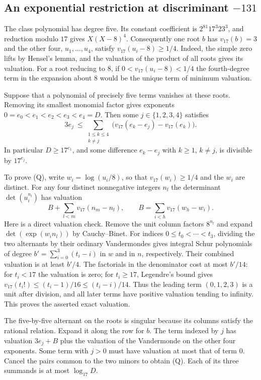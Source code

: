 \subsection{An exponential restriction at discriminant \texorpdfstring{$-131$}{-131}}
The class polynomial has degree five. Its constant coefficient is
$2^{81}17^3 23^3$, and reduction modulo $17$ gives $X(X-8)^4$.
Consequently one root $b$ has $v_{17}(b)=3$ and the other four,
$u_1,\ldots,u_4$, satisfy $v_{17}(u_i-8)\ge1/4$.
Indeed, the simple zero lifts by Hensel's lemma, and the valuation of
the product of all roots gives its valuation. For a root reducing to
$8$, if $0<v_{17}(u_i-8)<1/4$ the fourth-degree term in the expansion
about $8$ would be the unique term of minimum valuation.

Suppose that a polynomial of precisely five terms vanishes at these
roots. Removing its smallest monomial factor gives exponents
$0=e_0<e_1<e_2<e_3<e_4=D$. Then some $j\in\{1,2,3,4\}$ satisfies
\[
 3e_j\ \leq\!
 \sum_{\substack{1\leq k\leq4\\ k\ne j}}
    \big(v_{17}(e_k-e_j)-v_{17}(e_k)\big).
 \tag{Q}\label{eq:quinticgap}
\]
In particular $D\ge17^{e_1}$, and some difference $e_k-e_j$ with
$k\ge1$, $k\ne j$, is divisible by $17^{e_j}$.

To prove (Q), write $w_i=\log(u_i/8)$, so that
$v_{17}(w_i)\ge1/4$ and the $w_i$ are distinct. For any four distinct
nonnegative integers $n_l$ the determinant $\det(u_i^{n_l})$ has
valuation
\[
 B + \sum_{l<m}v_{17}(n_m-n_l),
 \qquad B=\sum_{i<h}v_{17}(w_h-w_i).
\]
Here is a direct valuation check. Remove the unit column factors
$8^{n_l}$ and expand $\det(\exp(w_i n_l))$ by Cauchy--Binet.
For indices $0\le t_0<\cdots<t_3$, dividing the two alternants by
their ordinary Vandermondes gives integral Schur polynomials of
degree $b'=\sum_{i=0}^3(t_i-i)$ in $w$ and in $n$, respectively.
Their combined valuation is at least $b'/4$. The factorials in the
denominator cost at most $b'/14$: for $t_i<17$ the valuation is zero;
for $t_i\ge17$, Legendre's bound gives
$v_{17}(t_i!)\le(t_i-1)/16\le(t_i-i)/14$.
Thus the leading term $(0,1,2,3)$ is a unit after division, and all
later terms have positive valuation tending to infinity. This proves
the asserted exact valuation.

The five-by-five alternant on the roots is singular because its
columns satisfy the rational relation. Expand it along the row for
$b$. The term indexed by $j$ has valuation $3e_j+B$ plus the
valuation of the Vandermonde on the other four exponents. Some term
with $j>0$ must have valuation at most that of term $0$.
Cancel the pairs common to the two minors to obtain (Q). Each of its
three summands is at most $\log_{17}D$.

